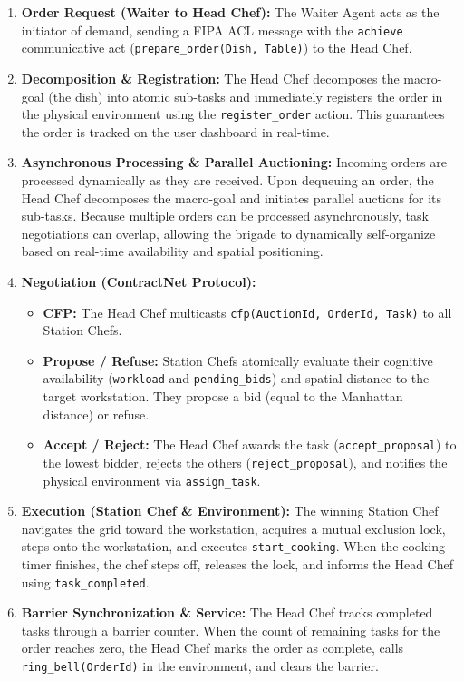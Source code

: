 \documentclass{scrartcl}
\begin{document}
\begin{enumerate}
\item \textbf{Order Request (Waiter to Head Chef):} The Waiter Agent acts as the initiator of demand, sending a FIPA ACL message with the \texttt{achieve} communicative act (\texttt{prepare\_order(Dish, Table)}) to the Head Chef.

\item \textbf{Decomposition \& Registration:} The Head Chef decomposes the macro-goal (the dish) into atomic sub-tasks and immediately registers the order in the physical environment using the \texttt{register\_order} action. This guarantees the order is tracked on the user dashboard in real-time.

\item \textbf{Asynchronous Processing \& Parallel Auctioning:} Incoming orders are processed dynamically as they are received. Upon dequeuing an order, the Head Chef decomposes the macro-goal and initiates parallel auctions for its sub-tasks. Because multiple orders can be processed asynchronously, task negotiations can overlap, allowing the brigade to dynamically self-organize based on real-time availability and spatial positioning.

\item \textbf{Negotiation (ContractNet Protocol):} 
\begin{itemize}
\item \textbf{CFP:} The Head Chef multicasts \texttt{cfp(AuctionId, OrderId, Task)} to all Station Chefs.
\item \textbf{Propose / Refuse:} Station Chefs atomically evaluate their cognitive availability (\texttt{workload} and \texttt{pending\_bids}) and spatial distance to the target workstation. They propose a bid (equal to the Manhattan distance) or refuse.
\item \textbf{Accept / Reject:} The Head Chef awards the task (\texttt{accept\_proposal}) to the lowest bidder, rejects the others (\texttt{reject\_proposal}), and notifies the physical environment via \texttt{assign\_task}.
\end{itemize}

\item \textbf{Execution (Station Chef \& Environment):} The winning Station Chef navigates the grid toward the workstation, acquires a mutual exclusion lock, steps onto the workstation, and executes \texttt{start\_cooking}. When the cooking timer finishes, the chef steps off, releases the lock, and informs the Head Chef using \texttt{task\_completed}.

\item \textbf{Barrier Synchronization \& Service:} The Head Chef tracks completed tasks through a barrier counter. When the count of remaining tasks for the order reaches zero, the Head Chef marks the order as complete, calls \texttt{ring\_bell(OrderId)} in the environment, and clears the barrier.
\end{enumerate}
\end{document}
